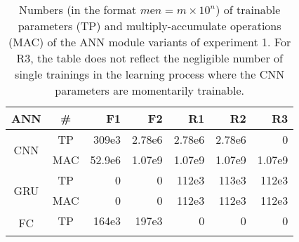\providecommand{\ncols}{}\renewcommand{\ncols}{7}
\begin{table}[h]
    \caption[
        Numbers of trainable parameters 
        and multiply-accumulate operations
        of the ANN module variants of experiment 1
    ]{
        Numbers (in the format $m\text{e}n = m\times 10^n$) of trainable parameters (TP)
        and multiply-accumulate operations (MAC)
        of the ANN module variants of experiment 1.
        For R3, the table does not reflect 
        the negligible number of single trainings 
        in the learning process
        where the CNN parameters are momentarily trainable.
        \label{tab:exp1_nums}}        
    \centering
    \begin{tabular}{|c|c|r|r|r|r|r|} 
        \hline
        ANN
        &\#
        &F1
        &F2
        &R1
        &R2
        &R3
        \\\hline\hline
        \multirow{2}{*}{CNN}
        &TP
        &309e3
        &2.78e6
        &2.78e6
        &2.78e6
        &0
        \\\cline{2-\ncols}
        &MAC
        &52.9e6
        &1.07e9
        &1.07e9
        &1.07e9
        &1.07e9
        \\\hline
        \multirow{2}{*}{GRU}
        &TP
        &0
        &0
        &112e3
        &113e3
        &112e3
        \\\cline{2-\ncols}
        &MAC
        &0
        &0
        &112e3
        &112e3
        &112e3
        \\\hline
        \multirow{2}{*}{FC}
        &TP
        &164e3
        &197e3
        &0
        &0
        &0
        \\\cline{2-\ncols}

\end{tabular}
\end{table}
